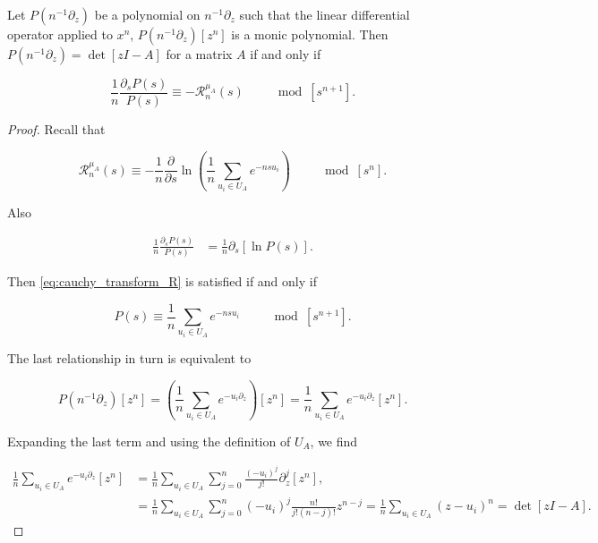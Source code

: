 \begin{theorem} \label{thm:if_and_only_if}
    Let $P(n^{-1}\partial_z)$ be a polynomial on $n^{-1}\partial_z$ such that the linear differential operator applied to $x^n$, $P(n^{-1}\partial_z)[z^n]$ is a monic polynomial. Then $P(n^{-1}\partial_z) = \det[zI - A]$ for a matrix $A$ if and only if 

    \begin{equation} \label{eq:cauchy_transform_R}
        \frac1n \frac{\partial_s P(s)}{P(s)} \equiv - \mathcal R_n^{\mu_A}(s) \qquad \mod [s^{n+1}].
    \end{equation}
\end{theorem}

\begin{proof}
    Recall that

    \begin{equation*}
        \mathcal R_{n}^{\mu_A}(s) \equiv - \frac1n \frac{\partial}{\partial s} \ln \left(\frac1n \sum_{u_i \in U_A} e^{-nsu_i} \right) \qquad \mod [s^n].
    \end{equation*}

    Also 

    \begin{align*}
        \frac1n \frac{\partial_s P(s)}{P(s)} &= \frac1n \partial_s[\ln P(s)].
    \end{align*}

    Then \eqref{eq:cauchy_transform_R} is satisfied if and only if 

    \begin{equation*}
        P(s) \equiv \frac1n \sum_{u_i \in U_A} e^{-nsu_i} \qquad \mod [s^{n+1}].
    \end{equation*}

    The last relationship in turn is equivalent to 

    \begin{equation*}
        P(n^{-1}\partial_z)[z^n] = \left( \frac1n \sum_{u_i \in U_A} e^{-u_i\partial_z} \right)[z^n] = \frac1n \sum_{u_i \in U_A} e^{-u_i\partial_z}[z^n].
    \end{equation*}

    Expanding the last term and using the definition of $U_A$, we find

    \begin{align*}
        \frac1n \sum_{u_i \in U_A} e^{-u_i\partial_z}[z^n] &=  \frac1n \sum_{u_i \in U_A} \sum_{j=0}^n \frac{(-u_i)^j}{j!} \partial_z^j[z^n],\\
        &= \frac1n \sum_{u_i \in U_A} \sum_{j=0}^n (-u_i)^j \frac{n!}{j!(n-j)!}z^{n-j} = \frac1n \sum_{u_i \in U_A} (z - u_i)^n = \det[zI - A].
    \end{align*}\end{proof}


